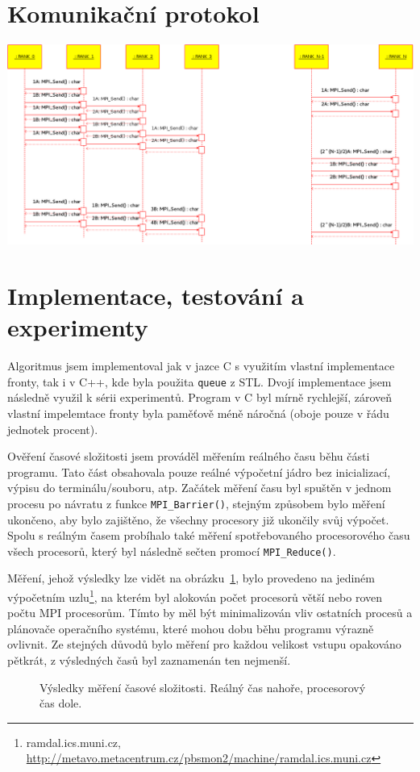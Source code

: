 \documentclass[a4paper, 12pt]{article}[21.3.2015]
\begin{document}
\section{Komunikační protokol} \label{protocol}
\includegraphics[width=\textwidth]{sequence_diagram}

\section{Implementace, testování a experimenty} \label{experiments}
Algoritmus jsem implementoval jak v jazce C s využitím vlastní implementace fronty, tak i v C++, kde byla použita \texttt{queue} z STL. Dvojí implementace jsem následně využil k sérii experimentů. Program v C byl mírně rychlejší, zároveň vlastní impelemtace fronty byla paměťově méně náročná (oboje pouze v řádu jednotek procent).

Ověření časové složitosti jsem prováděl měřením reálného času běhu části programu. Tato část obsahovala pouze reálné výpočetní jádro bez inicializací, výpisu do terminálu/souboru, atp. Začátek měření času byl spuštěn v jednom procesu po návratu z funkce \texttt{MPI\_Barrier()}, stejným způsobem bylo měření ukončeno, aby bylo zajištěno, že všechny procesory již ukončily svůj výpočet. Spolu s reálným časem probíhalo také měření spotřebovaného procesorového času všech procesorů, který byl následně sečten promocí \texttt{MPI\_Reduce()}.

Měření, jehož výsledky lze vidět na obrázku~\ref{complexity}, bylo provedeno na jediném výpočetním uzlu\footnote{ramdal.ics.muni.cz, \url{http://metavo.metacentrum.cz/pbsmon2/machine/ramdal.ics.muni.cz}}, na kterém byl alokován počet procesorů větší nebo roven počtu MPI procesorům. Tímto by měl být minimalizován vliv ostatních procesů a plánovače operačního systému, které mohou dobu běhu programu výrazně ovlivnit. Ze stejných důvodů bylo měření pro každou velikost vstupu opakováno pětkrát, z výsledných časů byl zaznamenán ten nejmenší.
\begin{figure}
	\centering
	\resizebox{\textwidth}{!}{} %
	\caption{Výsledky měření časové složitosti. Reálný čas nahoře, procesorový čas dole.}
	\label{complexity}
\end{figure}
\end{document}
